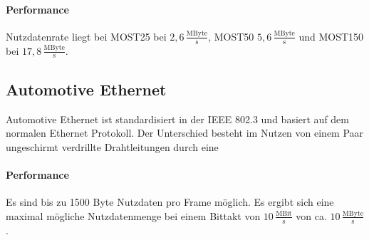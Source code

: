\paragraph{Performance}
Nutzdatenrate liegt bei MOST25 bei $ 2,6\,\frac{\mathrm{MByte}}{\mathrm{s}} $, MOST50 $ 5,6\,\frac{\mathrm{MByte}}{\mathrm{s}} $  und MOST150 bei $ 17,8\,\frac{\mathrm{MByte}}{\mathrm{s}} $.
\cite[Vgl. Seite 119 ff.]{Zimmermann.2014}
\subsection{Automotive Ethernet}
Automotive Ethernet ist standardisiert in der IEEE 802.3 und basiert auf dem normalen Ethernet Protokoll. Der Unterschied besteht im Nutzen von einem Paar ungeschirmt verdrillte Drahtleitungen durch eine
\paragraph{Performance}
Es sind bis zu 1500 Byte Nutzdaten pro Frame möglich. Es ergibt sich eine maximal mögliche Nutzdatenmenge bei einem Bittakt von $ 10\,\frac{\mathrm{MBit}}{\mathrm{s}} $ von ca. $ 10\,\frac{\mathrm{MByte}}{\mathrm{s}} $. \cite[Vgl. Seite 138 ff.]{Zimmermann.2014}
